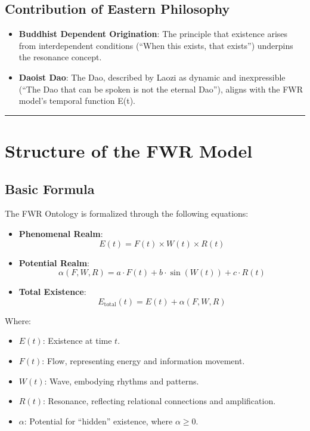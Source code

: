 \documentclass{article}
\begin{document}
\subsection{Contribution of Eastern Philosophy}
\begin{itemize}
    \item \textbf{Buddhist Dependent Origination}: The principle that existence arises from interdependent conditions (“When this exists, that exists”) underpins the resonance concept.
    \item \textbf{Daoist Dao}: The Dao, described by Laozi as dynamic and inexpressible (“The Dao that can be spoken is not the eternal Dao”), aligns with the FWR model’s temporal function E(t).
\end{itemize}

\hrule

\section{Structure of the FWR Model}

\subsection{Basic Formula}
The FWR Ontology is formalized through the following equations:
\begin{itemize}
    \item \textbf{Phenomenal Realm}:
    $$
    E(t) = F(t) \times W(t) \times R(t)
    $$
    \item \textbf{Potential Realm}:
    $$
    \alpha(F, W, R) = a \cdot F(t) + b \cdot \sin(W(t)) + c \cdot R(t)
    $$
    \item \textbf{Total Existence}:
    $$
    E_{\text{total}}(t) = E(t) + \alpha(F, W, R)
    $$
\end{itemize}
Where:
\begin{itemize}
    \item $E(t)$: Existence at time $t$.
    \item $F(t)$: Flow, representing energy and information movement.
    \item $W(t)$: Wave, embodying rhythms and patterns.
    \item $R(t)$: Resonance, reflecting relational connections and amplification.
    \item $\alpha$: Potential for “hidden” existence, where $\alpha \geq 0$.
\end{itemize}
\end{document}
